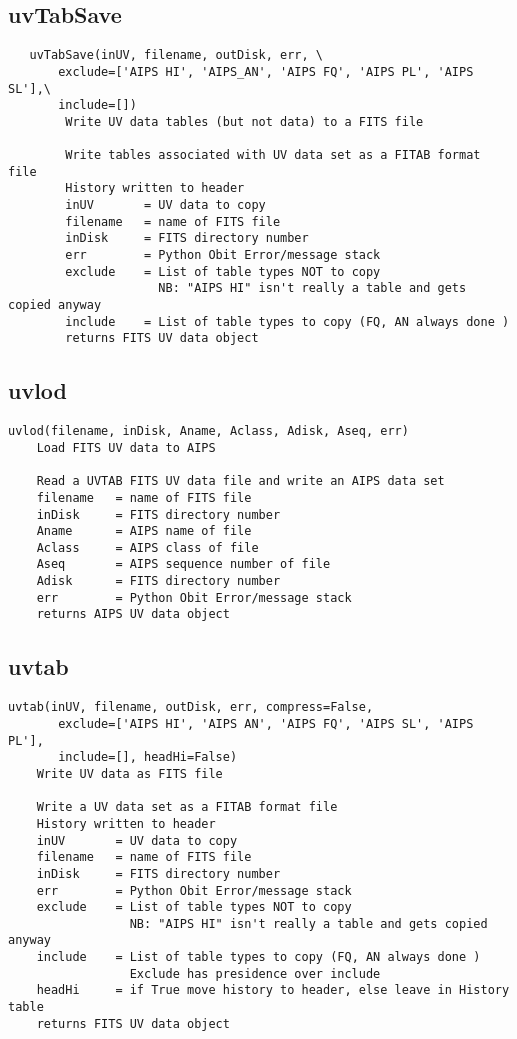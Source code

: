\documentclass[11pt]{report}
\begin{document}
\subsection{uvTabSave}
\begin{verbatim}
   uvTabSave(inUV, filename, outDisk, err, \
       exclude=['AIPS HI', 'AIPS_AN', 'AIPS FQ', 'AIPS PL', 'AIPS SL'],\
       include=[])
        Write UV data tables (but not data) to a FITS file
        
        Write tables associated with UV data set as a FITAB format file
        History written to header
        inUV       = UV data to copy
        filename   = name of FITS file
        inDisk     = FITS directory number
        err        = Python Obit Error/message stack
        exclude    = List of table types NOT to copy
                     NB: "AIPS HI" isn't really a table and gets copied anyway
        include    = List of table types to copy (FQ, AN always done )
        returns FITS UV data object
\end{verbatim}

\subsection{uvlod}
\begin{verbatim}
uvlod(filename, inDisk, Aname, Aclass, Adisk, Aseq, err)
    Load FITS UV data to AIPS
    
    Read a UVTAB FITS UV data file and write an AIPS data set
    filename   = name of FITS file
    inDisk     = FITS directory number
    Aname      = AIPS name of file
    Aclass     = AIPS class of file
    Aseq       = AIPS sequence number of file
    Adisk      = FITS directory number
    err        = Python Obit Error/message stack
    returns AIPS UV data object
\end{verbatim}

\subsection{uvtab}
\begin{verbatim}
uvtab(inUV, filename, outDisk, err, compress=False, 
       exclude=['AIPS HI', 'AIPS AN', 'AIPS FQ', 'AIPS SL', 'AIPS PL'], 
       include=[], headHi=False)
    Write UV data as FITS file
    
    Write a UV data set as a FITAB format file
    History written to header
    inUV       = UV data to copy
    filename   = name of FITS file
    inDisk     = FITS directory number
    err        = Python Obit Error/message stack
    exclude    = List of table types NOT to copy
                 NB: "AIPS HI" isn't really a table and gets copied anyway
    include    = List of table types to copy (FQ, AN always done )
                 Exclude has presidence over include
    headHi     = if True move history to header, else leave in History table
    returns FITS UV data object
\end{verbatim}
\end{document}
